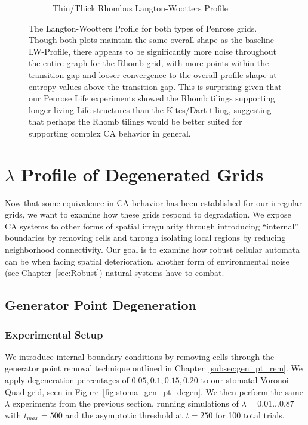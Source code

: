 \documentclass[a4paper,11pt]{report}
\begin{document}
\begin{figure}[htp]
\begin{subfigure}[t]{0.6\textwidth}
  \caption{Thin/Thick Rhombus Langton-Wootters Profile}
  \label{fig:crh_lw_profile}
  \end{subfigure}
\caption[Penrose Langton-Wootters Profile]{
  The Langton-Wootters Profile for both types of Penrose grids. Though both plots maintain the same overall shape as the baseline LW-Profile, there appears to be significantly more noise throughout the entire graph for the Rhomb grid, with more points within the transition gap and looser convergence to the overall profile shape at entropy values above the transition gap. This is surprising given that our Penrose Life experiments showed the Rhomb tilings supporting longer living Life structures than the Kites/Dart tiling, suggesting that perhaps the Rhomb tilings would be better suited for supporting complex CA behavior in general.
}
\label{fig:penrose_lw_profile}
\end{figure}

\section{$\lambda$ Profile of Degenerated Grids}

Now that some equivalence in CA behavior has been established for our irregular grids, we want to examine how these grids respond to degradation. We expose CA systems to other forms of spatial irregularity through introducing ``internal'' boundaries by removing cells and through isolating local regions by reducing neighborhood connectivity. Our goal is to examine how robust cellular automata can be when facing spatial deterioration, another form of environmental noise (see Chapter~\ref{sec:Robust}) natural systems have to combat.

\subsection{Generator Point Degeneration}

\subsubsection*{Experimental Setup}
We introduce internal boundary conditions by removing cells through the generator point removal technique outlined in Chapter~\ref{subsec:gen_pt_rem}. We apply degeneration percentages of $0.05,0.1, 0.15, 0.20$ to our stomatal Voronoi Quad grid, seen in Figure~\ref{fig:stoma_gen_pt_degen}. We then perform the same $\lambda$ experiments from the previous section, running simulations of $\lambda=0.01...0.87$ with $t_{max} = 500$ and the asymptotic threshold at $t=250$ for 100 total trials. 
\end{document}
